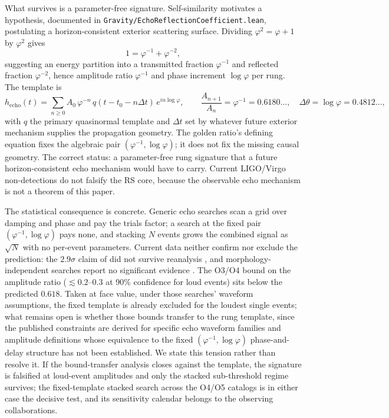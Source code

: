 \documentclass[11pt,letterpaper]{article}
\newcommand{\lean}[1]{\texttt{#1}}
\begin{document}
What survives is a parameter-free signature. Self-similarity motivates a hypothesis, documented in \lean{Gravity/EchoReflectionCoefficient.lean}, postulating a horizon-consistent exterior scattering surface. Dividing $\varphi^{2}=\varphi+1$ by $\varphi^{2}$ gives
\begin{equation}
1=\varphi^{-1}+\varphi^{-2},
\label{eq:partition}
\end{equation}
suggesting an energy partition into a transmitted fraction $\varphi^{-1}$ and reflected fraction $\varphi^{-2}$, hence amplitude ratio $\varphi^{-1}$ and phase increment $\log\varphi$ per rung. The template is
\begin{equation}
h_{\mathrm{echo}}(t)=\sum_{n\ge 0}A_{0}\,\varphi^{-n}\,q(t-t_{0}-n\Delta t)\,e^{in\log\varphi},\qquad
\frac{A_{n+1}}{A_{n}}=\varphi^{-1}=0.6180\ldots,\quad \Delta\theta=\log\varphi=0.4812\ldots,
\label{eq:echotemplate}
\end{equation}
with $q$ the primary quasinormal template and $\Delta t$ set by whatever future exterior mechanism supplies the propagation geometry. The golden ratio's defining equation fixes the algebraic pair $(\varphi^{-1},\log\varphi)$; it does not fix the missing causal geometry. The correct status: a parameter-free rung signature that a future horizon-consistent echo mechanism would have to carry. Current LIGO/Virgo non-detections do not falsify the RS core, because the observable echo mechanism is not a theorem of this paper.

The statistical consequence is concrete. Generic echo searches scan a grid over damping and phase and pay the trials factor; a search at the fixed pair $(\varphi^{-1},\log\varphi)$ pays none, and stacking $N$ events grows the combined signal as $\sqrt{N}$ with no per-event parameters. Current data neither confirm nor exclude the prediction: the $2.9\sigma$ claim of \cite{Abedi} did not survive reanalysis \cite{Westerweck}, and morphology-independent searches report no significant evidence \cite{Tsang}. The O3/O4 bound on the amplitude ratio ($\lesssim 0.2$--$0.3$ at 90\% confidence for loud events) sits below the predicted $0.618$. Taken at face value, under those searches' waveform assumptions, the fixed template is already excluded for the loudest single events; what remains open is whether those bounds transfer to the rung template, since the published constraints are derived for specific echo waveform families and amplitude definitions whose equivalence to the fixed $(\varphi^{-1},\log\varphi)$ phase-and-delay structure has not been established. We state this tension rather than resolve it. If the bound-transfer analysis closes against the template, the signature is falsified at loud-event amplitudes and only the stacked sub-threshold regime survives; the fixed-template stacked search across the O4/O5 catalogs is in either case the decisive test, and its sensitivity calendar belongs to the observing collaborations.
\end{document}
